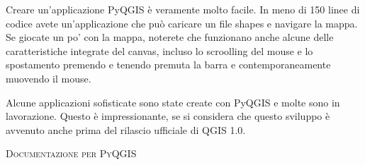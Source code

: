 Creare un'applicazione PyQGIS è veramente molto facile.  In meno di 150 linee di codice avete un'applicazione che può caricare un file shapes e navigare la mappa. Se giocate un po' con la mappa, noterete che funzionano anche alcune delle caratteristiche integrate del canvas, incluso lo scroolling del mouse e lo spostamento premendo e tenendo premuta la barra   e contemporaneamente muovendo il mouse.

Alcune applicazioni sofisticate sono state create con PyQGIS e molte sono in lavorazione. Questo è impressionante, se si considera che questo sviluppo è avvenuto anche prima del rilascio ufficiale di QGIS 1.0.

\begin{Tip}\caption{\textsc{Documentazione per PyQGIS}}
\end{Tip} 
